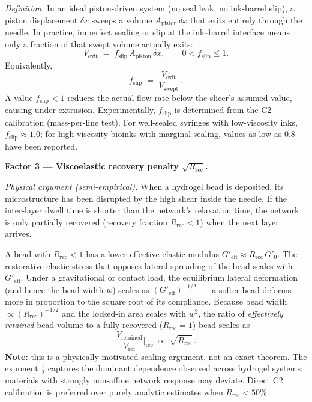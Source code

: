 \documentclass[11pt,a4paper]{article}
\begin{document}
\begin{derivationbox}[title={DERIVATION --- Each factor in $k_\mathrm{flow}=(1+\beta_\mathrm{swell})^2 f_\mathrm{slip}\sqrt{R_\mathrm{rec}}$}]
\emph{Definition.}
In an ideal piston-driven system (no seal leak, no ink-barrel slip), a
piston displacement $\delta x$ sweeps a volume $A_\mathrm{piston}\,\delta x$
that exits entirely through the needle. In practice, imperfect sealing
or slip at the ink--barrel interface means only a fraction of that swept
volume actually exits:
\begin{equation}
V_\mathrm{exit}
\;=\; f_\mathrm{slip}\,A_\mathrm{piston}\,\delta x,
\qquad 0 < f_\mathrm{slip}\leq 1.
\label{eq:fslip_def}
\end{equation}
Equivalently,
\begin{equation}
f_\mathrm{slip}
\;=\;
\frac{V_\mathrm{exit}}{V_\mathrm{swept}}\,.
\label{eq:fslip_ratio}
\end{equation}
A value $f_\mathrm{slip}<1$ reduces the actual flow rate below the
slicer's assumed value, causing under-extrusion. Experimentally,
$f_\mathrm{slip}$ is determined from the C2 calibration (mass-per-line
test). For well-sealed syringes with low-viscosity inks, $f_\mathrm{slip}
\approx 1.0$; for high-viscosity bioinks with marginal sealing, values as
low as 0.8 have been reported.

\medskip\noindent\textbf{Factor 3 --- Viscoelastic recovery penalty
$\sqrt{R_\mathrm{rec}}$.}

\emph{Physical argument (semi-empirical).}
When a hydrogel bead is deposited, its microstructure has been
disrupted by the high shear inside the needle. If the inter-layer
dwell time is shorter than the network's relaxation time, the network
is only partially recovered (recovery fraction $R_\mathrm{rec}<1$) when
the next layer arrives.

A bead with $R_\mathrm{rec}<1$ has a lower effective elastic modulus
$G'_\mathrm{eff}\approx R_\mathrm{rec}\,G'_0$. The restorative elastic
stress that opposes lateral spreading of the bead scales with
$G'_\mathrm{eff}$. Under a gravitational or contact load, the equilibrium
lateral deformation (and hence the bead width $w$) scales as
$(G'_\mathrm{eff})^{-1/2}$~--- a softer bead deforms more in proportion to
the square root of its compliance. Because bead width $\propto
(R_\mathrm{rec})^{-1/2}$ and the locked-in area scales with $w^2$,
the ratio of \emph{effectively retained} bead volume to a fully
recovered ($R_\mathrm{rec}=1$) bead scales as
\begin{equation}
\frac{V_\mathrm{retained}}{V_\mathrm{ref}}\Bigg|_\mathrm{rec}
\;\propto\; \sqrt{R_\mathrm{rec}}\,.
\label{eq:Rrec_factor}
\end{equation}
\textbf{Note:} this is a physically motivated scaling argument, not
an exact theorem. The exponent $\tfrac{1}{2}$ captures the dominant
dependence observed across hydrogel systems; materials with strongly
non-affine network response may deviate. Direct C2 calibration is
preferred over purely analytic estimates when $R_\mathrm{rec}<50\%$.


\end{derivationbox}
\end{document}
